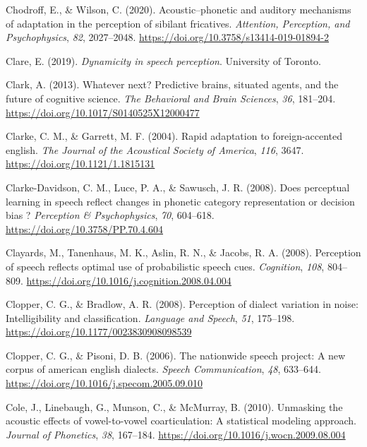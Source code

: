 \documentclass[
  11pt,
  man,floatsintext]{apa6}
\newlength{\cslhangindent}
\newlength{\cslentryspacingunit} %
\newenvironment{CSLReferences}[2] %
 {%
  \setlength{\parindent}{0pt}
  \ifodd #1
  \let\oldpar\par
  \def\par{\hangindent=\cslhangindent\oldpar}
  \fi
  \setlength{\parskip}{#2\cslentryspacingunit}
 }%
 {}
\begin{document}
\begin{CSLReferences}{1}{0}
\leavevmode{}%
Chodroff, E., \& Wilson, C. (2020). Acoustic--phonetic and auditory mechanisms of adaptation in the perception of sibilant fricatives. \emph{Attention, Perception, and Psychophysics}, \emph{82}, 2027--2048. \url{https://doi.org/10.3758/s13414-019-01894-2}

\leavevmode{}%
Clare, E. (2019). \emph{Dynamicity in speech perception}. University of Toronto.

\leavevmode{}%
Clark, A. (2013). Whatever next? Predictive brains, situated agents, and the future of cognitive science. \emph{The Behavioral and Brain Sciences}, \emph{36}, 181--204. \url{https://doi.org/10.1017/S0140525X12000477}

\leavevmode{}%
Clarke, C. M., \& Garrett, M. F. (2004). Rapid adaptation to foreign-accented english. \emph{The Journal of the Acoustical Society of America}, \emph{116}, 3647. \url{https://doi.org/10.1121/1.1815131}

\leavevmode{}%
Clarke-Davidson, C. M., Luce, P. A., \& Sawusch, J. R. (2008). Does perceptual learning in speech reflect changes in phonetic category representation or decision bias ? \emph{Perception \& Psychophysics}, \emph{70}, 604--618. \url{https://doi.org/10.3758/PP.70.4.604}

\leavevmode{}%
Clayards, M., Tanenhaus, M. K., Aslin, R. N., \& Jacobs, R. A. (2008). Perception of speech reflects optimal use of probabilistic speech cues. \emph{Cognition}, \emph{108}, 804--809. \url{https://doi.org/10.1016/j.cognition.2008.04.004}

\leavevmode{}%
Clopper, C. G., \& Bradlow, A. R. (2008). Perception of dialect variation in noise: Intelligibility and classification. \emph{Language and Speech}, \emph{51}, 175--198. \url{https://doi.org/10.1177/0023830908098539}

\leavevmode{}%
Clopper, C. G., \& Pisoni, D. B. (2006). The nationwide speech project: A new corpus of american english dialects. \emph{Speech Communication}, \emph{48}, 633--644. \url{https://doi.org/10.1016/j.specom.2005.09.010}

\leavevmode{}%
Cole, J., Linebaugh, G., Munson, C., \& McMurray, B. (2010). Unmasking the acoustic effects of vowel-to-vowel coarticulation: A statistical modeling approach. \emph{Journal of Phonetics}, \emph{38}, 167--184. \url{https://doi.org/10.1016/j.wocn.2009.08.004}


\end{CSLReferences}
\end{document}
